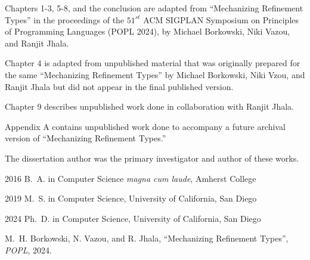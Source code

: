 \begin{frontmatter}
\begin{acknowledgements}
    Chapters 1-3, 5-8, and the conclusion are adapted from 
    ``Mechanizing Refinement Types'' in the proceedings of the 
    $51^{st}$ ACM SIGPLAN Symposium on Principles of Programming
    Languages (POPL 2024), by Michael Borkowski, Niki Vazou, and
    Ranjit Jhala.
    
    Chapter 4 is adapted from unpublished material that was originally
    prepared for the same  ``Mechanizing Refinement Types''
    by Michael Borkowski, Niki Vzou, and Ranjit Jhala but did not 
    appear in the final published version.

    Chapter 9 describes unpublished work done in collaboration with Ranjit Jhala.

    Appendix A contains unpublished work done to accompany a
    future archival version of ``Mechanizing Refinement Types.''

    The dissertation author was the primary investigator and author of these works.


\end{acknowledgements}


%
%
\begin{vitapage}
\begin{vita}
  \item[2016] B.~A. in Computer Science \emph{magna cum laude}, Amherst College
  \item[2019] M.~S. in Computer Science, University of California, San Diego
  \item[2024] Ph.~D. in Computer Science, University of California, San Diego
\end{vita}
\begin{publications}
  \item M.~H. Borkowski, N. Vazou, and R. Jhala, ``Mechanizing Refinement Types'', \emph{POPL}, 2024.
\end{publications}
\end{vitapage}



\end{frontmatter}

